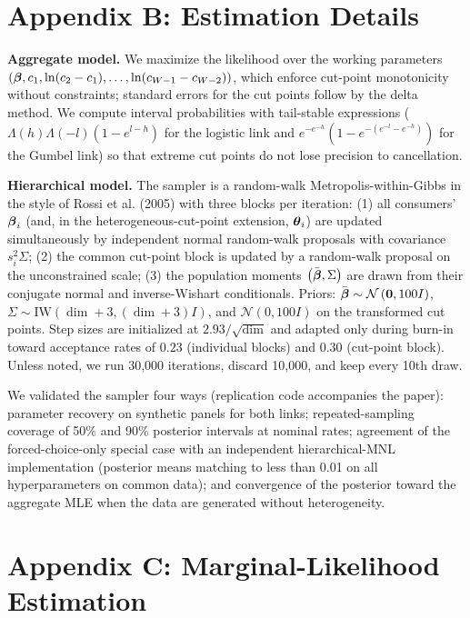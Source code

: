 \documentclass[
  letterpaper,
  DIV=11,
  numbers=noendperiod]{scrartcl}
\theoremstyle{plain}
\theoremstyle{plain}
\theoremstyle{plain}
\theoremstyle{remark}
\begin{document}
\section*{Appendix B: Estimation Details}\label{sec-appendix-estimation}

\textbf{Aggregate model.} We maximize the likelihood over the working
parameters
\(\left( \boldsymbol{\beta}, c_1, \ln(c_2 - c_1), \ldots, \ln(c_{W-1} - c_{W-2}) \right)\),
which enforce cut-point monotonicity without constraints; standard
errors for the cut points follow by the delta method. We compute
interval probabilities with tail-stable expressions
(\(\Lambda(h)\Lambda(-l)(1 - e^{l-h})\) for the logistic link and
\(e^{-e^{-h}}\left(1 - e^{-(e^{-l} - e^{-h})}\right)\) for the Gumbel
link) so that extreme cut points do not lose precision to cancellation.

\textbf{Hierarchical model.} The sampler is a random-walk
Metropolis-within-Gibbs in the style of Rossi et al. (2005) with three
blocks per iteration: (1) all consumers' \(\boldsymbol{\beta}_i\) (and, in the
heterogeneous-cut-point extension, \(\boldsymbol{\theta}_i\)) are updated
simultaneously by independent normal random-walk proposals with
covariance \(s_i^2 \Sigma\); (2) the common cut-point block is updated
by a random-walk proposal on the unconstrained scale; (3) the population
moments \(\left( \bar{\boldsymbol{\beta}}, \Sigma \right)\) are drawn from their
conjugate normal and inverse-Wishart conditionals. Priors:
\(\bar{\boldsymbol{\beta}} \sim \mathcal{N}\left( \mathbf{0}, 100 I \right)\),
\(\Sigma \sim \text{IW}\left( \dim + 3, (\dim + 3) I \right)\), and
\(\mathcal{N}(0, 100 I)\) on the transformed cut points. Step sizes are
initialized at \(2.93/\sqrt{\dim}\) and adapted only during burn-in
toward acceptance rates of \(0.23\) (individual blocks) and \(0.30\)
(cut-point block). Unless noted, we run 30,000 iterations, discard
10,000, and keep every 10th draw.

We validated the sampler four ways (replication code accompanies the
paper): parameter recovery on synthetic panels for both links;
repeated-sampling coverage of 50\% and 90\% posterior intervals at
nominal rates; agreement of the forced-choice-only special case with an
independent hierarchical-MNL implementation (posterior means matching to
less than 0.01 on all hyperparameters on common data); and convergence
of the posterior toward the aggregate MLE when the data are generated
without heterogeneity.

\section*{Appendix C: Marginal-Likelihood
Estimation}\label{sec-appendix-lmd}
\end{document}
